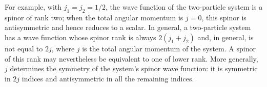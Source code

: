 For example, with $j_1=j_2=1/2$, the wave function of the two-particle system is a spinor of rank two; when the total angular momentum is $j=0$, this spinor is antisymmetric and hence reduces to a scalar.
In general, a two-particle system has a wave function whose spinor rank is always $2(j_1+j_2)$ and, in general, is not equal to $2j$, where $j$ is the total angular momentum of the system.
A spinor of this rank may nevertheless be equivalent to one of lower rank.
More generally, $j$ determines the symmetry of the system's spinor wave function: it is symmetric in $2j$ indices and antisymmetric in all the remaining indices.
